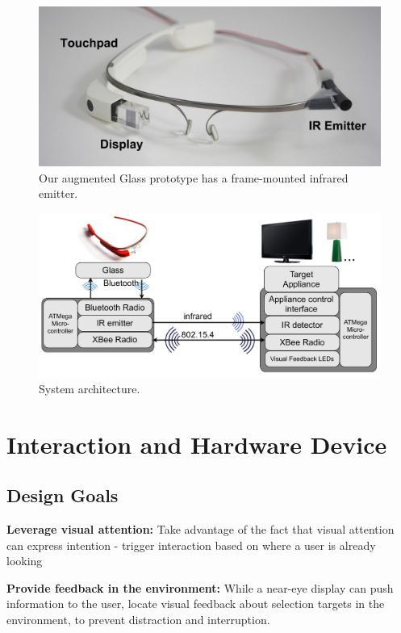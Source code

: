 \begin{figure}[t]
\centering
\includegraphics[width=1.0\columnwidth]{figures/glass-with-ir}
\caption{Our augmented Glass prototype has a frame-mounted infrared emitter.}
\label{fig:glass}
\end{figure}
\begin{figure}[t]
\centering
\includegraphics[width=1.0\columnwidth]{figures/architecture}
\caption{System architecture.}
\label{fig:architecture}
\end{figure}

\section{Interaction and Hardware Device}

\subsection{Design Goals}
{\bf Leverage visual attention:} Take advantage of the fact that visual attention can express intention - trigger interaction based on where a user is already looking

{\bf Provide feedback in the environment:} While a near-eye display can push information to the user, locate visual feedback about selection targets in the environment, to prevent distraction and interruption.

